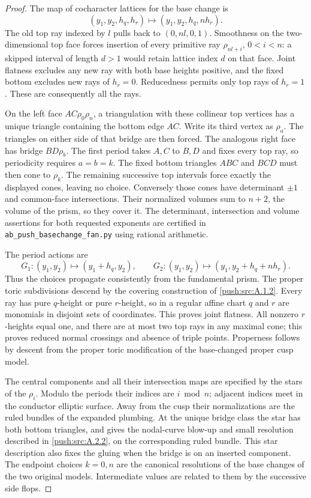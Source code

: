 \begin{proof}
The map of cocharacter lattices for the base change is
\[
 (y_1,y_2,h_q,h_r)\longmapsto
 (y_1,y_2,h_q,nh_r).
\]
The old top ray indexed by $l$ pulls back to
$(0,nl,0,1)$. Smoothness on the two-dimensional top
face forces insertion of every primitive ray
$\rho_{nl+i}$, $0<i<n$: a skipped interval of length
$d>1$ would retain lattice index $d$ on that face.
Joint flatness excludes any new ray with both base
heights positive, and the fixed bottom excludes new
rays of $h_r=0$. Reducedness permits only top rays
of $h_r=1$. These are consequently all the rays.

On the left face $AC\rho_0\rho_n$, a triangulation
with these collinear top vertices has a unique triangle
containing the bottom edge $AC$. Write its third
vertex as $\rho_a$. The triangles on either side
of that bridge are then forced. The analogous right
face has bridge $BD\rho_b$. The first period takes
$A,C$ to $B,D$ and fixes every top ray, so periodicity
requires $a=b=k$. The fixed bottom triangles $ABC$
and $BCD$ must then cone to $\rho_k$. The remaining
successive top intervals force exactly the displayed
cones, leaving no choice. Conversely those cones
have determinant $\pm1$ and common-face
intersections. Their normalized volumes sum to
$n+2$, the volume of the prism, so they cover it.
The determinant, intersection and volume assertions
for both requested exponents are certified in
\texttt{ab\_push\_basechange\_fan.py} using rational
arithmetic.

The period actions are
\[
 G_1:(y_1,y_2)\mapsto(y_1+h_q,y_2),\qquad
 G_2:(y_1,y_2)\mapsto(y_1,y_2+h_q+nh_r).
\]
Thus the choices propagate consistently from the
fundamental prism. The proper toric subdivisions
descend by the covering construction of \ref{push:src:A.1.2}.
Every ray has pure $q$-height or pure $r$-height, so
in a regular affine chart $q$ and $r$ are monomials
in disjoint sets of coordinates. This proves joint
flatness. All nonzero $r$-heights equal one, and
there are at most two top rays in any maximal cone;
this proves reduced normal crossings and absence of
triple points. Properness follows by descent from
the proper toric modification of the base-changed
proper cusp model.

The central components and all their intersection
maps are specified by the stars of the $\rho_i$.
Modulo the periods their indices are $i\bmod n$;
adjacent indices meet in the conductor elliptic
surface. Away from the cusp their normalizations
are the ruled bundles of the expanded plumbing.
At the unique bridge class the star has both bottom
triangles, and gives the nodal-curve blow-up and
small resolution described in \ref{push:src:A.2.2}, on the
corresponding ruled bundle. This star description
also fixes the gluing when the bridge is on an
inserted component. The endpoint choices $k=0,n$
are the canonical resolutions of the base changes
of the two original models. Intermediate values
are related to them by the successive side flops.


\end{proof}
